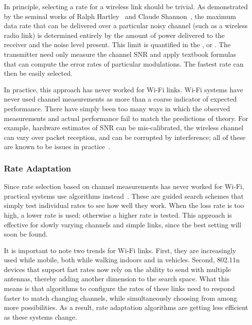 In principle, selecting a rate for a wireless link should be trivial. As demonstrated by the seminal works of Ralph Hartley~\cite{Hartley_law} and Claude Shannon~\cite{Shannon_coding,Shannon_capacity}, the maximum data rate that can be delivered over a particular noisy channel (such as a wireless radio link) is determined entirely by the amount of power delivered to the receiver and the noise level present. This limit is quantified in the , or . The transmitter need only measure the channel SNR and apply textbook formulas that can compute the error rates of particular modulations. The fastest rate can then be easily selected.

In practice, this approach has never worked for Wi-Fi links. Wi-Fi systems have never used channel measurements as more than a coarse indicator of expected performance. There have simply been too many ways in which the observed measurements and actual performance fail to match the predictions of theory. For example, hardware estimates of SNR can be mis-calibrated, the wireless channel can vary over packet reception, and can be corrupted by interference; all of these are known to be issues in practice~\cite{Camp_rateadapt,Judd_CHARM,Reis_sigcomm06}.

\subsubsection{Rate Adaptation}
Since rate selection based on channel measurements has never worked for Wi-Fi, practical systems use  algorithms instead~\cite{Bicket_SampleRate,Minstrel,Wong_RRAA}. These are guided search schemes that simply test individual rates to see how well they work. When the loss rate is too high, a lower rate is used; otherwise a higher rate is tested. This approach is effective for slowly varying channels and simple links, since the best setting will soon be found.

It is important to note two trends for Wi-Fi links. First, they are increasingly used while mobile, both while walking indoors and in vehicles. Second, 802.11n devices that support fast rates now rely on the ability to send with multiple antennas, thereby adding another dimension to the search space. What this means is that algorithms to configure the rates of these links need to respond faster to match changing channels, while simultaneously choosing from among more possibilities. As a result, rate adaptation algorithms are getting less efficient as these systems change.

